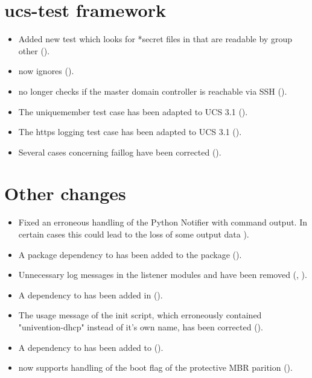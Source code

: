 \section{ucs-test framework}
\begin{itemize}
\item Added new test 
  which looks for *secret files in  that are readable by
  group other ().

\item {} now ignores
   ().

\item {} no longer checks if the
  master domain controller is reachable via SSH ().

\item The uniquemember test case has been adapted to UCS 3.1 ().

\item The https logging test case has been adapted to UCS 3.1 ().

\item Several  cases concerning faillog have been corrected ().

\end{itemize}


\section{Other changes}
\begin{itemize}
\item Fixed an erroneous handling of the Python Notifier with command
  output. In certain cases this could lead to the loss of some output
  data ).

\item A package dependency to  has been
  added to the package  ().

\item Unnecessary log messages in the listener modules
   and  have been
  removed (, ).

\item A dependency to  has been added in
 ().

\item The usage message of the  init script,
  which erroneously contained "univention-dhcp" instead of it's own
  name, has been corrected ().

\item A dependency to  has been added to
   ().

\item {} now supports handling of the boot flag of the
protective MBR parition ().
\end{itemize}

